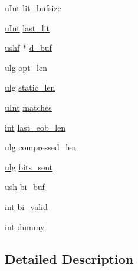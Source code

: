 \begin{DoxyCompactItemize}
\item 
\hyperlink{zconf_8h_a87d141052bcd5ec8a80812a565c70369}{u\-Int} \hyperlink{structinternal__state_a25ad7fc0094e412144b4201df2126bbb}{lit\-\_\-bufsize}
\item 
\hyperlink{zconf_8h_a87d141052bcd5ec8a80812a565c70369}{u\-Int} \hyperlink{structinternal__state_a01689001a8f8c7dfa46a439b7ae0708a}{last\-\_\-lit}
\item 
\hyperlink{zutil_8h_ab854e4722acf30ada8a7a71b58d1b238}{ushf} $\ast$ \hyperlink{structinternal__state_ac636c34c1c08dc9d2f9c199ce2caa99d}{d\-\_\-buf}
\item 
\hyperlink{zutil_8h_abd6f60bf9450af2ecb94097a32c19a64}{ulg} \hyperlink{structinternal__state_a2f6efee5d2057aba8bca2c1a58cf418a}{opt\-\_\-len}
\item 
\hyperlink{zutil_8h_abd6f60bf9450af2ecb94097a32c19a64}{ulg} \hyperlink{structinternal__state_a8a83e269866761afa3a7b4641ba5ff91}{static\-\_\-len}
\item 
\hyperlink{zconf_8h_a87d141052bcd5ec8a80812a565c70369}{u\-Int} \hyperlink{structinternal__state_ac0f10ec7237615f6b632f2f4d14872ef}{matches}
\item 
\hyperlink{ioapi_8h_a787fa3cf048117ba7123753c1e74fcd6}{int} \hyperlink{structinternal__state_abf71c5672f4fce10f6f6a99eb30f72e1}{last\-\_\-eob\-\_\-len}
\item 
\hyperlink{zutil_8h_abd6f60bf9450af2ecb94097a32c19a64}{ulg} \hyperlink{structinternal__state_af62d9cb9d4c3c1b98a650eac93407893}{compressed\-\_\-len}
\item 
\hyperlink{zutil_8h_abd6f60bf9450af2ecb94097a32c19a64}{ulg} \hyperlink{structinternal__state_aee0c85796a195200d20ff447859dec9b}{bits\-\_\-sent}
\item 
\hyperlink{zutil_8h_a3754180d606d4ed15468d15d9665aa2e}{ush} \hyperlink{structinternal__state_a6880946d081053778f5f544b04603d13}{bi\-\_\-buf}
\item 
\hyperlink{ioapi_8h_a787fa3cf048117ba7123753c1e74fcd6}{int} \hyperlink{structinternal__state_a241f3606e41a3aa0ef22868a41bd9a0f}{bi\-\_\-valid}
\item 
\hyperlink{ioapi_8h_a787fa3cf048117ba7123753c1e74fcd6}{int} \hyperlink{structinternal__state_ab000a3e3c901dd063859521988ad7e52}{dummy}
\end{DoxyCompactItemize}


\subsection{Detailed Description}


